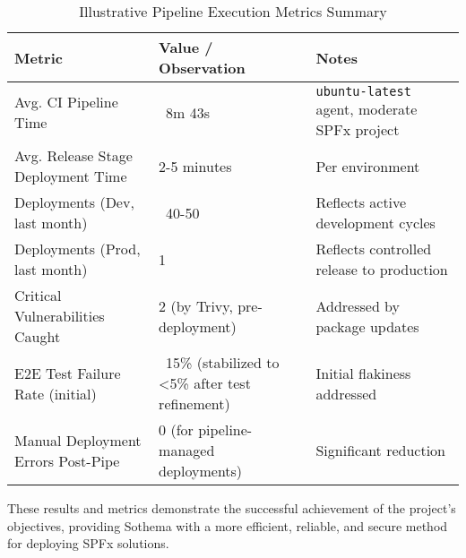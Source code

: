 \begin{table}[htbp]
    \centering
    \caption{Illustrative Pipeline Execution Metrics Summary}
    \label{tab:PipelineExecutionMetrics}
    \begin{tabular}{|l|p{6cm}|p{5cm}|}
        \hline
        \textbf{Metric} & \textbf{Value / Observation} & \textbf{Notes} \\
        \hline
        Avg. CI Pipeline Time & ~8m 43s & \texttt{ubuntu-latest} agent, moderate SPFx project \\
        \hline
        Avg. Release Stage Deployment Time & 2-5 minutes & Per environment \\
        \hline
        Deployments (Dev, last month) & ~40-50 & Reflects active development cycles \\
        \hline
        Deployments (Prod, last month) & 1 & Reflects controlled release to production \\
        \hline
        Critical Vulnerabilities Caught & 2 (by Trivy, pre-deployment) & Addressed by package updates \\
        \hline
        E2E Test Failure Rate (initial) & ~15\% (stabilized to <5\% after test refinement) & Initial flakiness addressed \\
        \hline
        Manual Deployment Errors Post-Pipe & 0 (for pipeline-managed deployments) & Significant reduction \\
        \hline
    \end{tabular}
\end{table}

These results and metrics demonstrate the successful achievement of the project's objectives, providing Sothema with a more efficient, reliable, and secure method for deploying SPFx solutions.
